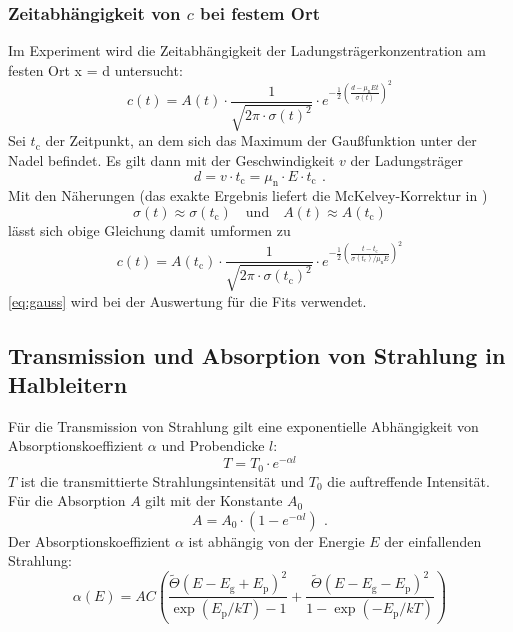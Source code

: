 \subsubsection*{Zeitabhängigkeit von $c$ bei festem Ort}
Im Experiment wird die Zeitabhängigkeit der Ladungsträgerkonzentration am festen Ort x = d untersucht:
\begin{equation}
\label{}
c(t) = A(t)
\cdot
\frac{1}{\sqrt{2  \pi  \cdot \sigma(t)^2}}
\cdot
e^{-\frac{1}{2}(\frac{d - \mu_{\text{n}} E t}{\sigma(t)})^2}
\end{equation}
Sei $t_{\text{c}}$ der Zeitpunkt, an dem sich das Maximum der Gaußfunktion unter der Nadel befindet.
Es gilt dann mit der Geschwindigkeit $v$ der Ladungsträger
\begin{equation}
\label{}
d = v \cdot t_{\text{c}} = \mu_{\text{n}} \cdot E \cdot t_{\text{c}} \ \, .
\end{equation}
Mit den Näherungen (das exakte Ergebnis liefert die McKelvey-Korrektur in \cite{staatsex})
\begin{equation}
\label{}
\sigma(t) \approx \sigma(t_{\text{c}}) \quad \text{und} \quad A(t) \approx A(t_{\text{c}})
\end{equation}
lässt sich obige Gleichung damit umformen zu
\begin{equation}
\label{eq:gauss}
c(t) = A(t_{\text{c}})
\cdot
\frac{1}{\sqrt{2  \pi  \cdot \sigma(t_{\text{c}})^2}}
\cdot
e^{-\frac{1}{2}\left(\frac{t - t_{\text{c}}}{\sigma(t_{\text{c}}) / \mu_{\text{n}} E}\right)^2}
\end{equation}
\autoref{eq:gauss} wird bei der Auswertung für die Fits verwendet.


\subsection{Transmission und Absorption von Strahlung in Halbleitern}
\label{sub:part1:princ:transabs}
Für die Transmission von Strahlung gilt eine exponentielle Abhängigkeit von Absorptionskoeffizient
$\alpha$ und Probendicke $l$:
\begin{equation}
\label{}
T = T_0 \cdot e^{-\alpha l}
\end{equation}
$T$ ist die transmittierte Strahlungsintensität und $T_0$ die auftreffende Intensität.
Für die Absorption $A$ gilt mit der Konstante $A_0$
\begin{equation}
\label{}
A = A_0 \cdot (1 - e^{-\alpha l}) \ \, .
\end{equation}
Der Absorptionskoeffizient $\alpha$ ist abhängig von der Energie $E$ der einfallenden Strahlung:
\begin{equation}
\label{}
\alpha(E) = AC \left(
\frac{\tilde{\Theta}(E-E_{\text{g}}+E_{\text{p}})^2}{\exp (E_{\text{p}}/kT)-1}+
\frac{\tilde{\Theta}(E-E_{\text{g}}-E_{\text{p}})^2}{1-\exp (-E_{\text{p}}/kT)}
\right)
\end{equation}

